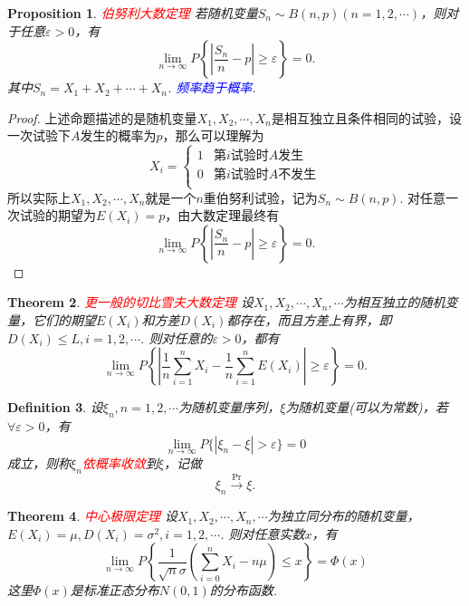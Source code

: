 \documentclass{article}
\newtheorem{theorem}{Theorem}[section]
\newtheorem{proposition}[theorem]{Proposition}
\newtheorem{definition}[theorem]{Definition}
\newcommand{\redt}[1]{\textcolor{red}{#1}}
\newcommand{\bluet}[1]{\textcolor{blue}{#1}}
\begin{document}
\begin{proposition}
\rm \redt{伯努利大数定理} 若随机变量$S_n \sim B(n,p)(n=1,2,\cdots)$，则对于任意$\varepsilon > 0$，有
$$
\lim\limits_{n \rightarrow \infty}P\left\{\left|\frac{S_n}{n} -p\right| \geq \varepsilon\right\} = 0.
$$
其中$S_n = X_1+X_2+\cdots+X_n$. \bluet{频率趋于概率}. 
\end{proposition}

\begin{proof}
\rm 上述命题描述的是随机变量$X_1,X_2,\cdots,X_n$是相互独立且条件相同的试验，设一次试验下$A$发生的概率为$p$，那么可以理解为
$$
X_i = \left\{  \begin{array}{ll}
1 & \text{第$i$试验时$A$发生}\\
0 & \text{第$i$试验时$A$不发生}\\
\end{array}  \right.
$$ 
所以实际上$X_1,X_2,\cdots,X_n$就是一个$n$重伯努利试验，记为$S_n \sim B(n,p)$. 对任意一次试验的期望为$E(X_i) = p$，由大数定理最终有
$$
\lim\limits_{n \rightarrow \infty}P\left\{\left|\frac{S_n}{n} -p\right| \geq \varepsilon\right\} = 0.
$$ 
\end{proof}

\begin{theorem}
\rm \redt{更一般的切比雪夫大数定理} 设$X_1,X_2,\cdots,X_n,\cdots$为相互独立的随机变量，它们的期望$E(X_i)$和方差$D(X_i)$都存在，而且方差上有界，即$D(X_i) \leq L, i = 1,2,\cdots$. 则对任意的$\varepsilon > 0$，都有
$$
\lim\limits_{n \to \infty} P\left\{ \left| \frac{1}{n} \sum\limits_{i=1}^n X_i - \frac{1}{n} \sum\limits_{i=1}^n E(X_i) \right| \geq \varepsilon \right\} = 0. 
$$
\end{theorem}

\begin{definition}
\rm 设$\xi_n, n = 1,2,\cdots$为随机变量序列，$\xi$为随机变量(可以为常数)，若$\forall \varepsilon > 0$，有
$$
\lim\limits_{n \to \infty} P\{ |\xi_n -\xi| > \varepsilon \} = 0
$$
成立，则称$\xi_n$\redt{依概率收敛}到$\xi$，记做
$$
\xi_n \xrightarrow{\text{Pr}} \xi.
$$
\end{definition}


\begin{theorem}
\rm \redt{中心极限定理} 设$X_1,X_2,\cdots,X_n,\cdots$为独立同分布的随机变量，$E(X_i)=\mu,D(X_i)=\sigma^2,i=1,2,\cdots$. 则对任意实数$x$，有
$$
\lim\limits_{n \rightarrow \infty}P\left\{\frac{1}{\sqrt{n}\sigma}\left(\sum\limits_{i=0}^nX_i - n\mu \right) \leq x\right\} = \Phi(x)
$$
这里$\Phi(x)$是标准正态分布$N(0,1)$的分布函数. 
\end{theorem}
\end{document}
